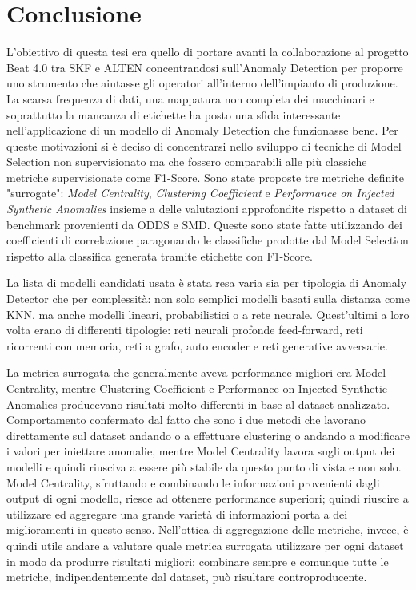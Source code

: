 \chapter{Conclusione}
\label{chap:conclusion}
L'obiettivo di questa tesi era quello di portare avanti la collaborazione al progetto Beat 4.0 tra SKF e ALTEN concentrandosi sull'Anomaly Detection per proporre uno strumento che aiutasse gli operatori all'interno dell'impianto di produzione. La scarsa frequenza di dati, una mappatura non completa dei macchinari e soprattutto la mancanza di etichette ha posto una sfida interessante nell'applicazione di un modello di Anomaly Detection che funzionasse bene.
Per queste motivazioni si è deciso di concentrarsi nello sviluppo di tecniche di Model Selection non supervisionato ma che fossero comparabili alle più classiche metriche supervisionate come F1-Score.
Sono state proposte tre metriche definite "surrogate": \textit{Model Centrality}, \textit{Clustering Coefficient} e \textit{Performance on Injected Synthetic Anomalies} insieme a delle valutazioni approfondite rispetto a dataset di benchmark provenienti da ODDS e SMD. Queste sono state fatte utilizzando dei coefficienti di correlazione paragonando le classifiche prodotte dal Model Selection rispetto alla classifica generata tramite etichette con F1-Score.

La lista di modelli candidati usata è stata resa varia sia per tipologia di Anomaly Detector che per complessità: non solo semplici modelli basati sulla distanza come KNN, ma anche modelli lineari, probabilistici o a rete neurale. Quest'ultimi a loro volta erano di differenti tipologie: reti neurali profonde feed-forward, reti ricorrenti con memoria, reti a grafo, auto encoder e reti generative avversarie.

La metrica surrogata che generalmente aveva performance migliori era Model Centrality, mentre Clustering Coefficient e Performance on Injected Synthetic Anomalies producevano risultati molto differenti in base al dataset analizzato. Comportamento confermato dal fatto che sono i due metodi che lavorano direttamente sul dataset andando o a effettuare clustering o andando a modificare i valori per iniettare anomalie, mentre Model Centrality lavora sugli output dei modelli e quindi riusciva a essere più stabile da questo punto di vista e non solo. Model Centrality, sfruttando e combinando le informazioni provenienti dagli output di ogni modello, riesce ad ottenere performance superiori; quindi riuscire a utilizzare ed aggregare una grande varietà di informazioni porta a dei miglioramenti in questo senso.
Nell'ottica di aggregazione delle metriche, invece, è quindi utile andare a valutare quale metrica surrogata utilizzare per ogni dataset in modo da produrre risultati migliori: combinare sempre e comunque tutte le metriche, indipendentemente dal dataset, può risultare controproducente.


